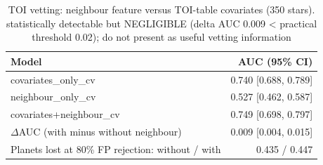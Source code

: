 \begin{table}[htbp]\centering\small
\caption{TOI vetting: neighbour feature versus TOI-table covariates (350 stars). statistically detectable but NEGLIGIBLE (delta AUC 0.009 < practical threshold 0.02); do not present as useful vetting information}\label{tab:toi}
\begin{tabular}{lr}
\toprule
Model & AUC (95\% CI) \\
\midrule
covariates\_only\_cv & 0.740 [0.688, 0.789] \\
neighbour\_only\_cv & 0.527 [0.462, 0.587] \\
covariates+neighbour\_cv & 0.749 [0.698, 0.797] \\
$\Delta$AUC (with minus without neighbour) & 0.009 [0.004, 0.015] \\
Planets lost at 80\% FP rejection: without / with & 0.435 / 0.447 \\
\bottomrule
\end{tabular}
\end{table}
